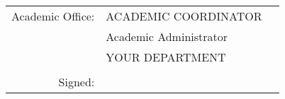 \begin{center}
\begin{tabular}{rlc}
		{\small \sc Academic Office:}
								& ACADEMIC COORDINATOR  & \\
	                            & Academic Administrator & \\
	                            & YOUR DEPARTMENT & \\
		\\ %
		{\small \sc Signed:} & \cline{1-1} \\	    	
	\end{tabular}	
\end{center}

